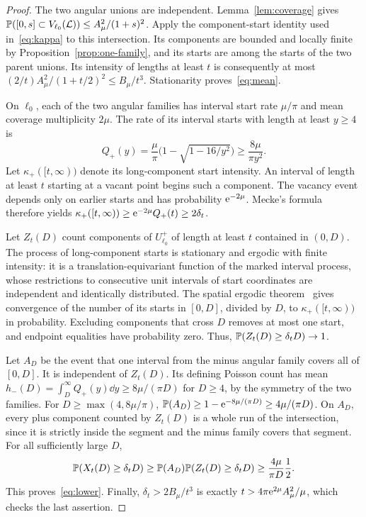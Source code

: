 \documentclass[11pt,letterpaper]{article}
\begin{document}
\begin{proof}
The two angular unions are independent. Lemma~\ref{lem:coverage} gives $\P([0,s]\subset V_{\ell_0}(\cL))\le A_\mu^2/(1+s)^2$. Apply the component-start identity used in~\eqref{eq:kappa} to this intersection. Its components are bounded and locally finite by Proposition~\ref{prop:one-family}, and its starts are among the starts of the two parent unions. Its intensity of lengths at least $t$ is consequently at most $(2/t)A_\mu^2/(1+t/2)^2\le B_\mu/t^3$. Stationarity proves~\eqref{eq:mean}.

On $\ell_0$, each of the two angular families has interval start rate $\mu/\pi$ and mean coverage multiplicity $2\mu$. The rate of its interval starts with length at least $y\ge4$ is
\begin{equation}\label{eq:one-side-tail}
 Q_+(y)=\frac\mu\pi\big(1-\sqrt{1-16/y^2}\big)
       \ge\frac{8\mu}{\pi y^2}.
\end{equation}
Let $\kappa_+([t,\infty))$ denote its long-component start intensity. An interval of length at least $t$ starting at a vacant point begins such a component. The vacancy event depends only on earlier starts and has probability $\e^{-2\mu}$. Mecke's formula therefore yields $\kappa_+([t,\infty))\ge\e^{-2\mu}Q_+(t)\ge2\delta_t$.

Let $Z_t(D)$ count components of $U_{\ell_0}^+$ of length at least $t$ contained in $(0,D)$. The process of long-component starts is stationary and ergodic with finite intensity: it is a translation-equivariant function of the marked interval process, whose restrictions to consecutive unit intervals of start coordinates are independent and identically distributed. The spatial ergodic theorem~\cite[Theorem~8.14]{LP17} gives convergence of the number of its starts in $[0,D]$, divided by $D$, to $\kappa_+([t,\infty))$ in probability. Excluding components that cross $D$ removes at most one start, and endpoint equalities have probability zero. Thus, $\P(Z_t(D)\ge\delta_tD)\to1$.

Let $A_D$ be the event that one interval from the minus angular family covers all of $[0,D]$. It is independent of $Z_t(D)$. Its defining Poisson count has mean $h_-(D)=\int_D^\infty Q_+(y)\dd y\ge8\mu/(\pi D)$ for $D\ge4$, by the symmetry of the two families. For $D\ge\max(4,8\mu/\pi)$, $\P(A_D)\ge1-\e^{-8\mu/(\pi D)}\ge4\mu/(\pi D)$. On $A_D$, every plus component counted by $Z_t(D)$ is a whole run of the intersection, since it is strictly inside the segment and the minus family covers that segment. For all sufficiently large $D$,
\begin{equation}\label{eq:product-lower}
 \P(X_t(D)\ge\delta_tD)
 \ge\P(A_D)\P(Z_t(D)\ge\delta_tD)
 \ge\frac{4\mu}{\pi D}\frac12.
\end{equation}
This proves~\eqref{eq:lower}. Finally, $\delta_t>2B_\mu/t^3$ is exactly $t>4\pi\e^{2\mu}A_\mu^2/\mu$, which checks the last assertion.
\end{proof}
\end{document}
